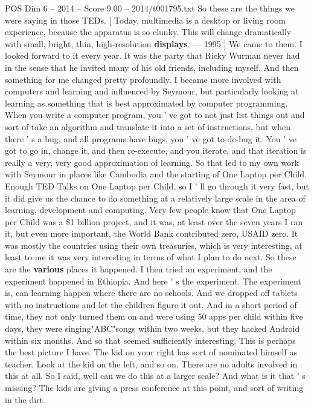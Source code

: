 \begin{textsample}{POS Dim 6 – 2014 – Score 9.00 – 2014/t001795.txt}
So these are the things we were saying in those TEDs. [ Today, multimedia is a desktop or living room experience, because the apparatus is so clunky.
This will change dramatically with small, bright, thin, high-resolution \textbf{displays}. — 1995 ] We came to them.
I looked forward to it every year.
It was the party that Ricky Wurman never had in the sense that he invited many of his old friends, including myself.
And then something for me changed pretty profoundly.
I became more involved with computers and learning and influenced by Seymour, but particularly looking at learning as something that is best approximated by computer programming.
When you write a computer program, you ' ve got to not just list things out and sort of take an algorithm and translate it into a set of instructions, but when there ' s a bug, and all programs have bugs, you ' ve got to de-bug it.
You ' ve got to go in, change it, and then re-execute, and you iterate, and that iteration is really a very, very good approximation of learning.
So that led to my own work with Seymour in places like Cambodia and the starting of One Laptop per Child.
Enough TED Talks on One Laptop per Child, so I ' ll go through it very fast, but it did give us the chance to do something at a relatively large scale in the area of learning, development and computing.
Very few people know that One Laptop per Child was a \$1 billion project, and it was, at least over the seven years I ran it, but even more important, the World Bank contributed zero, USAID zero.
It was mostly the countries using their own treasuries, which is very interesting, at least to me it was very interesting in terms of what I plan to do next.
So these are the \textbf{various} places it happened.
I then tried an experiment, and the experiment happened in Ethiopia.
And here ' s the experiment.
The experiment is, can learning happen where there are no schools.
And we dropped off tablets with no instructions and let the children figure it out.
And in a short period of time, they not only turned them on and were using 50 apps per child within five days, they were singing"ABC"songs within two weeks, but they hacked Android within six months.
And so that seemed sufficiently interesting.
This is perhaps the best picture I have.
The kid on your right has sort of nominated himself as teacher.
Look at the kid on the left, and so on.
There are no adults involved in this at all.
So I said, well can we do this at a larger scale?
And what is it that ' s missing?
The kids are giving a press conference at this point, and sort of writing in the dirt.

\end{textsample}
